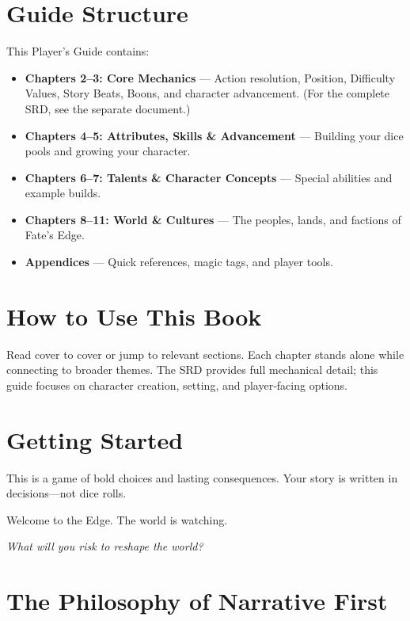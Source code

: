 \section*{Guide Structure}

This Player's Guide contains:
\begin{itemize}
\item \textbf{Chapters 2–3: Core Mechanics} — Action resolution, Position, Difficulty Values, Story Beats, Boons, and character advancement. (For the complete SRD, see the separate document.)
\item \textbf{Chapters 4–5: Attributes, Skills \& Advancement} — Building your dice pools and growing your character.
\item \textbf{Chapters 6–7: Talents \& Character Concepts} — Special abilities and example builds.
\item \textbf{Chapters 8–11: World \& Cultures} — The peoples, lands, and factions of Fate's Edge.
\item \textbf{Appendices} — Quick references, magic tags, and player tools.
\end{itemize}

\section*{How to Use This Book}

Read cover to cover or jump to relevant sections. Each chapter stands alone while connecting to broader themes. The SRD provides full mechanical detail; this guide focuses on character creation, setting, and player‑facing options.

\section*{Getting Started}

This is a game of bold choices and lasting consequences. Your story is written in decisions—not dice rolls.

Welcome to the Edge. The world is watching.

\begin{center}
\emph{What will you risk to reshape the world?}
\end{center}

\section{The Philosophy of Narrative First}
\label{sec:narrative-first}

